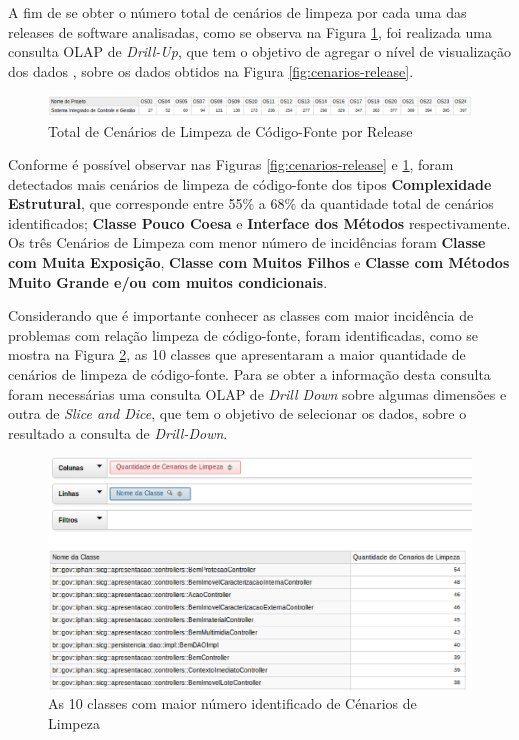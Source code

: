A fim de se obter o número total de cenários de limpeza por cada uma das releases de software analisadas, como se observa na Figura \ref{fig:cenarios-total}, foi realizada uma consulta OLAP de \textit{Drill-Up}, que tem o objetivo de agregar o nível de visualização dos dados \cite{Kimball2002}, sobre os dados obtidos na Figura \ref{fig:cenarios-release}.

\begin{figure}[ht!]
\centering
\includegraphics[keepaspectratio=true,scale=0.45]{figuras/total-cenarios-release.eps}
\caption{Total de Cenários de Limpeza de Código-Fonte por Release}
\label{fig:cenarios-total}
\end{figure}
\FloatBarrier

Conforme é possível observar nas Figuras \ref{fig:cenarios-release} e \ref{fig:cenarios-total}, foram detectados mais cenários de limpeza de código-fonte dos tipos \textbf{Complexidade Estrutural}, que corresponde entre 55\% a 68\% da quantidade total de cenários identificados; \textbf{Classe Pouco Coesa} e \textbf{Interface dos Métodos} respectivamente. Os três Cenários de Limpeza com menor número de incidências foram \textbf{Classe com Muita Exposição}, \textbf{Classe com Muitos Filhos} e \textbf{Classe com Métodos Muito Grande e/ou com muitos condicionais}.

Considerando que é importante conhecer as classes com maior incidência de problemas com relação limpeza de código-fonte, foram identificadas, como se mostra na Figura \ref{fig:worst-10-cenarios}, as 10 classes que apresentaram a maior quantidade de cenários de limpeza de código-fonte. Para se obter a informação desta consulta foram necessárias uma consulta OLAP de \textit{Drill Down} sobre algumas dimensões e outra de \textit{Slice and Dice}, que tem o objetivo de selecionar os dados, sobre o resultado a consulta de \textit{Drill-Down}.    

\begin{figure}[ht!]
\centering
\includegraphics[keepaspectratio=true,scale=0.55]{figuras/10-best.eps}
\caption{As 10 classes com maior número identificado de Cénarios de Limpeza}
\label{fig:worst-10-cenarios}
\end{figure}
\FloatBarrier

